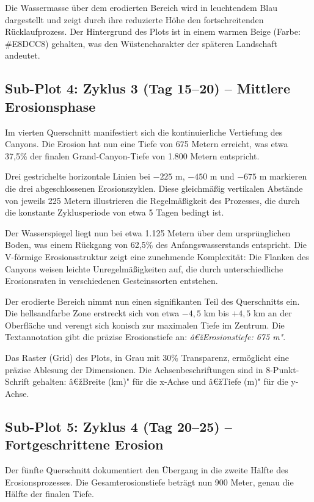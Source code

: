 ﻿\documentclass[12pt,a4paper]{report}
\begin{document}
Die Wassermasse über dem erodierten Bereich wird in leuchtendem Blau dargestellt und zeigt durch ihre reduzierte Höhe den fortschreitenden Rücklaufprozess. Der Hintergrund des Plots ist in einem warmen Beige (Farbe: \#E8DCC8) gehalten, was den Wüstencharakter der späteren Landschaft andeutet.

\subsection{Sub-Plot 4: Zyklus 3 (Tag 15--20) -- Mittlere Erosionsphase}

Im vierten Querschnitt manifestiert sich die kontinuierliche Vertiefung des Canyons. Die Erosion hat nun eine Tiefe von 675 Metern erreicht, was etwa 37,5\% der finalen Grand-Canyon-Tiefe von 1.800 Metern entspricht.

Drei gestrichelte horizontale Linien bei $-225$ m, $-450$ m und $-675$ m markieren die drei abgeschlossenen Erosionszyklen. Diese gleichmäßig vertikalen Abstände von jeweils 225 Metern illustrieren die Regelmäßigkeit des Prozesses, die durch die konstante Zyklusperiode von etwa 5 Tagen bedingt ist.

Der Wasserspiegel liegt nun bei etwa 1.125 Metern über dem ursprünglichen Boden, was einem Rückgang von 62,5\% des Anfangswasserstands entspricht. Die V-förmige Erosionsstruktur zeigt eine zunehmende Komplexität: Die Flanken des Canyons weisen leichte Unregelmäßigkeiten auf, die durch unterschiedliche Erosionsraten in verschiedenen Gesteinssorten entstehen.

Der erodierte Bereich nimmt nun einen signifikanten Teil des Querschnitts ein. Die hellsandfarbe Zone erstreckt sich von etwa $-4,5$ km bis $+4,5$ km an der Oberfläche und verengt sich konisch zur maximalen Tiefe im Zentrum. Die Textannotation gibt die präzise Erosionstiefe an: \textit{â€žErosionstiefe: 675 m"}.

Das Raster (Grid) des Plots, in Grau mit 30\% Transparenz, ermöglicht eine präzise Ablesung der Dimensionen. Die Achsenbeschriftungen sind in 8-Punkt-Schrift gehalten: â€žBreite (km)" für die x-Achse und â€žTiefe (m)" für die y-Achse.

\subsection{Sub-Plot 5: Zyklus 4 (Tag 20--25) -- Fortgeschrittene Erosion}

Der fünfte Querschnitt dokumentiert den Übergang in die zweite Hälfte des Erosionsprozesses. Die Gesamterosionstiefe beträgt nun 900 Meter, genau die Hälfte der finalen Tiefe.
\end{document}
